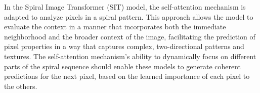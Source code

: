     In the Spiral Image Transformer (SIT) model, the self-attention mechanism is adapted to analyze pixels in a spiral pattern. This approach allows the model to evaluate the context in a manner that incorporates both the immediate neighborhood and the broader context of the image, facilitating the prediction of pixel properties in a way that captures complex, two-directional patterns and textures. The self-attention mechanism's ability to dynamically focus on different parts of the spiral sequence should enable these models to generate coherent predictions for the next pixel, based on the learned importance of each pixel to the others.

